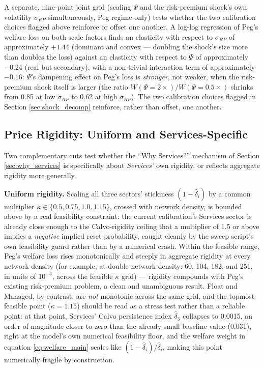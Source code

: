 \documentclass[12pt]{article}
\begin{document}
A separate, nine-point joint grid (scaling $\Psi$ and the risk-premium shock's own volatility
$\sigma_{RP}$ simultaneously, Peg regime only) tests whether the two calibration choices flagged above
reinforce or offset one another. A log-log regression of Peg's welfare loss on both scale factors
finds an elasticity with respect to $\sigma_{RP}$ of approximately $+1.44$ (dominant and convex ---
doubling the shock's size more than doubles the loss) against an elasticity with respect to $\Psi$ of
approximately $-0.24$ (real but secondary), with a non-trivial interaction term of approximately
$-0.16$: $\Psi$'s dampening effect on Peg's loss is \emph{stronger}, not weaker, when the risk-premium
shock itself is larger (the ratio $W(\Psi{=}2\times)/W(\Psi{=}0.5\times)$ shrinks from 0.85 at low
$\sigma_{RP}$ to 0.62 at high $\sigma_{RP}$). The two calibration choices flagged in Section
\ref{sec:shock_decomp} reinforce, rather than offset, one another.

\subsection{Price Rigidity: Uniform and Services-Specific}
\label{rob:rigidity}

Two complementary cuts test whether the ``Why Services?'' mechanism of Section \ref{sec:why_services}
is specifically about \emph{Services'} own rigidity, or reflects aggregate rigidity more generally.

\textbf{Uniform rigidity.} Scaling all three sectors' stickiness $(1-\hat\delta_i)$ by a common
multiplier $\kappa\in\{0.5,0.75,1.0,1.15\}$, crossed with network density, is bounded above by a real
feasibility constraint: the current calibration's Services sector is already close enough to the
Calvo-rigidity ceiling that a multiplier of 1.5 or above implies a \emph{negative} implied reset
probability, caught cleanly by the sweep script's own feasibility guard rather than by a numerical
crash. Within the feasible range, Peg's welfare loss rises monotonically and steeply in aggregate
rigidity at every network density (for example, at double network density: 60, 104, 182, and 251,
in units of $10^{-4}$, across the feasible $\kappa$ grid) --- rigidity compounds with Peg's existing
risk-premium problem, a clean and unambiguous result. Float and Managed, by contrast, are
\emph{not} monotonic across the same grid, and the topmost feasible point ($\kappa=1.15$) should be
read as a stress test rather than a reliable point: at that point, Services' Calvo persistence index
$\hat\delta_3$ collapses to 0.0015, an order of magnitude closer to zero than the already-small
baseline value (0.031), right at the model's own numerical feasibility floor, and the welfare weight
in equation \eqref{eq:welfare_main} scales like $(1-\hat\delta_i)/\hat\delta_i$, making this point
numerically fragile by construction.
\end{document}
